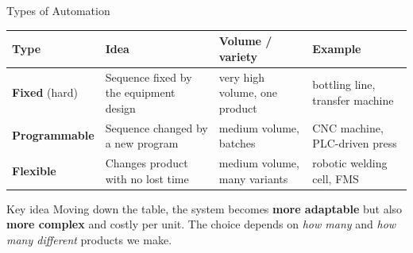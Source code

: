\documentclass[aspectratio=169]{beamer}
\begin{document}
	\begin{frame}{Types of Automation}
		\renewcommand{\arraystretch}{1.4}
		\centering
		\begin{tabular}{@{}>{\raggedright}p{2.5cm}>{\raggedright}p{3.9cm}>{\raggedright}p{3.0cm}>{\raggedright\arraybackslash}p{3.2cm}@{}}
			\toprule
			\textbf{Type} & \textbf{Idea} & \textbf{Volume / variety} & \textbf{Example} \\
			\midrule
			\textbf{Fixed} (hard)   & Sequence fixed by the equipment design & very high volume, one product & bottling line, transfer machine \\
			\textbf{Programmable}   & Sequence changed by a new program       & medium volume, batches        & CNC machine, PLC-driven press \\
			\textbf{Flexible}       & Changes product with no lost time       & medium volume, many variants  & robotic welding cell, FMS \\
			\bottomrule
		\end{tabular}
		\vspace{0.4cm}
		\begin{block}{Key idea}
			Moving down the table, the system becomes \textbf{more adaptable} but also \textbf{more complex} and costly per unit. The choice depends on \emph{how many} and \emph{how many different} products we make.
		\end{block}
	\end{frame}
\end{document}
